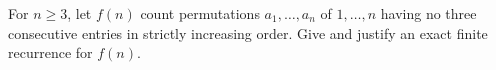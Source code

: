 For $n\ge3$, let $f(n)$ count permutations $a_1,\ldots,a_n$ of $1,\ldots,n$ having no three consecutive entries in strictly increasing order. Give and justify an exact finite recurrence for $f(n)$.
